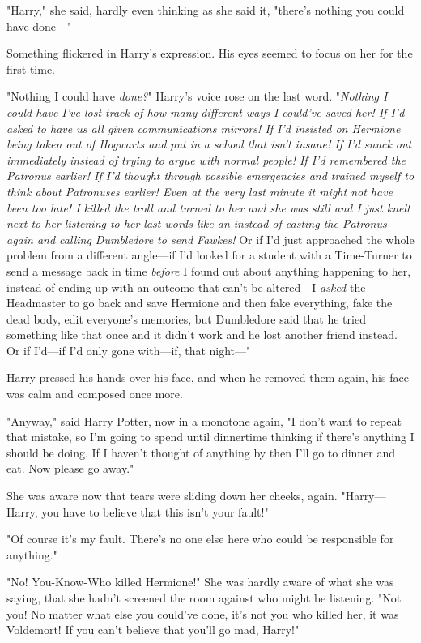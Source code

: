 "Harry," she said, hardly even thinking as she said it, "there's nothing you
could have done\mbox{---}"

Something flickered in Harry's expression. His eyes seemed to focus on her for
the first time.

"Nothing I could have \emph{done?}" Harry's voice rose on the last word.
"\emph{Nothing I could have  I've lost track of how many different ways I
could've saved her! If I'd asked to have us all given communications mirrors!
If I'd insisted on Hermione being taken out of Hogwarts and put in a school
that isn't insane! If I'd snuck out immediately instead of trying to argue with
normal people! If I'd remembered the Patronus earlier! If I'd thought through
possible emergencies and trained myself to think about Patronuses earlier! Even
at the very last minute it might not have been too late! I killed the troll and
turned to her and she was still  and I just knelt next to her listening to
her last words like an  instead of casting the Patronus again and calling
Dumbledore to send Fawkes!} Or if I'd just approached the whole problem from a
different angle---if I'd looked for a student with a Time-Turner to send a
message back in time \emph{before} I found out about anything happening to her,
instead of ending up with an outcome that can't be altered---I \emph{asked} the
Headmaster to go back and save Hermione and then fake everything, fake the dead
body, edit everyone's memories, but Dumbledore said that he tried something
like that once and it didn't work and he lost another friend instead. Or if
I'd---if I'd only gone with---if, that night\mbox{---}"

Harry pressed his hands over his face, and when he removed them again, his face
was calm and composed once more.

"Anyway," said Harry Potter, now in a monotone again, "I don't want to repeat
that mistake, so I'm going to spend until dinnertime thinking if there's
anything I should be doing. If I haven't thought of anything by then I'll go to
dinner and eat. Now please go away."

She was aware now that tears were sliding down her cheeks, again.
"Harry---Harry, you have to believe that this isn't your fault!"

"Of course it's my fault. There's no one else here who could be responsible for
anything."

"No! You-Know-Who killed Hermione!" She was hardly aware of what she was
saying, that she hadn't screened the room against who might be listening. "Not
you! No matter what else you could've done, it's not you who killed her, it was
Voldemort! If you can't believe that you'll go mad, Harry!"

